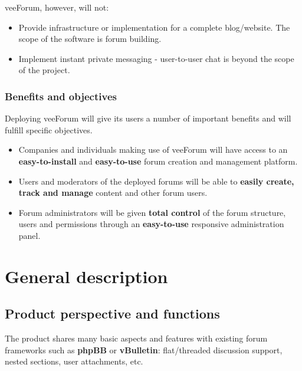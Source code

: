 \documentclass[12pt]{report}
\renewcommand\emph{\textbf}
\begin{document}
                        veeForum, however, will not:

                        \begin{itemize}
                            \item Provide infrastructure or implementation for a complete blog/website. The scope of the software is forum building.
                            \item Implement instant private messaging - user-to-user chat is beyond the scope of the project.
                        \end{itemize}

                    \subsubsection{Benefits and objectives}

                        Deploying veeForum will give its users a number of important benefits and will fulfill specific objectives.

                        \begin{itemize}
                            \item Companies and individuals making use of veeForum will have access to an \emph{easy-to-install} and \emph{easy-to-use} forum creation and management platform.
                            \item Users and moderators of the deployed forums will be able to \emph{easily create, track and manage} content and other forum users.
                            \item Forum administrators will be given \emph{total control} of the forum structure, users and permissions through an \emph{easy-to-use} responsive administration panel.
                        \end{itemize}

            \section{General description}
                \subsection{Product perspective and functions}
                    The product shares many basic aspects and features with existing forum frameworks such as \emph{phpBB} or \emph{vBulletin}: flat/threaded discussion support, nested sections, user attachments, etc.
\end{document}
